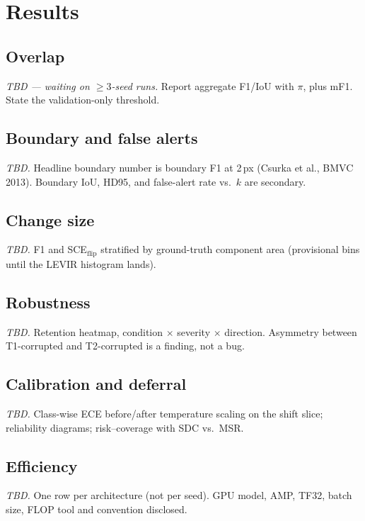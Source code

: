 \section{Results}
\label{sec:results}


\subsection{Overlap}
\emph{TBD --- waiting on $\ge 3$-seed runs.} Report aggregate F1/IoU
with $\pi$, plus mF1. State the validation-only threshold.

\subsection{Boundary and false alerts}
\emph{TBD.} Headline boundary number is boundary F1 at 2\,px
(Csurka et al., BMVC 2013). Boundary IoU, HD95, and false-alert rate
vs.\ $k$ are secondary.

\subsection{Change size}
\emph{TBD.} F1 and SCE$_{\mathrm{flip}}$ stratified by ground-truth
component area (provisional bins until the LEVIR histogram lands).

\subsection{Robustness}
\emph{TBD.} Retention heatmap, condition $\times$ severity $\times$
direction. Asymmetry between T1-corrupted and T2-corrupted is a
finding, not a bug.

\subsection{Calibration and deferral}
\emph{TBD.} Class-wise ECE before/after temperature scaling on the
shift slice; reliability diagrams; risk--coverage with SDC vs.\ MSR.

\subsection{Efficiency}
\emph{TBD.} One row per architecture (not per seed). GPU model, AMP,
TF32, batch size, FLOP tool and convention disclosed.
